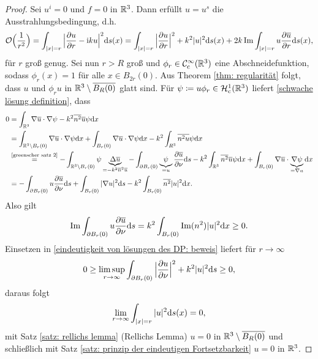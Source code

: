 \begin{proof}
	Sei \(u^i=0\) und \(f=0\) in \(\mathbb{R}^3\). Dann erfüllt \(u=u^s\) die Ausstrahlungsbedingung, d.h.
	\begin{equation}
		\label{eindeutigkeit von lösungen des DP: beweis}
		\mathcal{O}\Big(\frac{1}{r^2}\Big)
		=\int_{|x|=r}\Big|\frac{\partial u}{\partial r}-\mathrm{i} ku\Big|^2\mathrm{d}s(x)
		=\int_{|x|=r}\Big|\frac{\partial u}{\partial r}\Big|^2+k^2|u|^2\mathrm{d}s(x)+2k\operatorname{Im}\int_{|x|=r}u\frac{\partial\overline{u}}{\partial r}\mathrm{d}s(x),
	\end{equation}
	für \(r\) groß genug. Sei nun \(r>R\) groß und \(\phi_r\in\mathcal{C}_{\mathrm{c}}^\infty(\mathbb{R}^3)\) eine Abschneidefunktion, sodass \(\phi_r(x)=1\) für alle \(x\in B_{2r}(0)\). Aus Theorem \ref{thm: regularität} folgt, dass \(u\) und \(\phi_ru\) in \(\mathbb{R}^3\setminus \overline{B_R(0)}\) glatt sind. Für \(\psi\coloneqq u\phi_r\in\mathcal{H}_{\mathrm{c}}^1(\mathbb{R}^3)\) liefert \eqref{schwache lösung definition}, dass
	\begin{align*}
		0&=\int_{\mathbb{R}^3}\nabla\overline{ u}\cdot\nabla\psi-k^2\overline{n^2}\overline{u}\psi\mathrm{d}x\\
		&=\int_{\mathbb{R}^3\setminus B_r(0)}\nabla\overline{u}\cdot\nabla\psi\mathrm{d}x+\int_{B_r(0)}\nabla\overline{u}\cdot\nabla\psi\mathrm{d}x-k^2\int_{R^3}\overline{n^2u}\psi\mathrm{d}x\\
		&\overset{\scriptsize\eqref{greenscher satz 2}}{=}-\int_{\mathbb{R}^3\setminus B_r(0)}\psi\underbrace{\Delta\overline{u}}_{=-k^2\overline{n}^2\overline{u}}-\int_{\partial B_r(0)}\underbrace{\psi}_{=u}\frac{\partial\overline{u}}{\partial \nu}\mathrm{d}s-k^2\int_{\mathbb{R}^3}\overline{n^2}\overline{u}\psi\mathrm{d}x+\int_{B_r(0)}\nabla\overline{u}\cdot\underbrace{\nabla\psi}_{=\nabla u}\mathrm{d}x\\
		&=-\int_{\partial B_r(0)}u\frac{\partial\overline{u}}{\partial\nu}\mathrm{d}s+\int_{B_r(0)}|\nabla u|^2\mathrm{d}s-k^2\int_{B_r(0)}\overline{n^2}|u|^2\mathrm{d}x.
	\end{align*}
	Also gilt
	\begin{equation*}
		\operatorname{Im}\int_{\partial B_r(0)}u\frac{\partial \overline{u}}{\partial\nu}\mathrm{d}s=k^2\int_{B_r(0)}\operatorname{Im}(n^2)|u|^2\mathrm{d}x\geq0.
	\end{equation*}
	Einsetzen in \eqref{eindeutigkeit von lösungen des DP: beweis} liefert für \(r\to\infty\)
	\begin{equation*}
		0\geq\limsup_{r\to\infty}\int_{\partial B_r(0)}\Big|\frac{\partial u}{\partial\nu}\Big|^2+k^2|u|^2\mathrm{d}s\geq0,
	\end{equation*}
	daraus folgt
	\begin{equation*}
		\lim_{r\to\infty}\int_{|x|=r}|u|^2\mathrm{d}s(x)=0,
	\end{equation*}
	mit Satz \ref{satz: rellichs lemma} (Rellichs Lemma) \(u=0\) in \(\mathbb{R}^3\setminus\overline{B_R(0)}\) und schließlich mit Satz \ref{satz: prinzip der eindeutigen Fortsetzbarkeit} \(u=0\) in \(\mathbb{R}^3\).
\end{proof}
